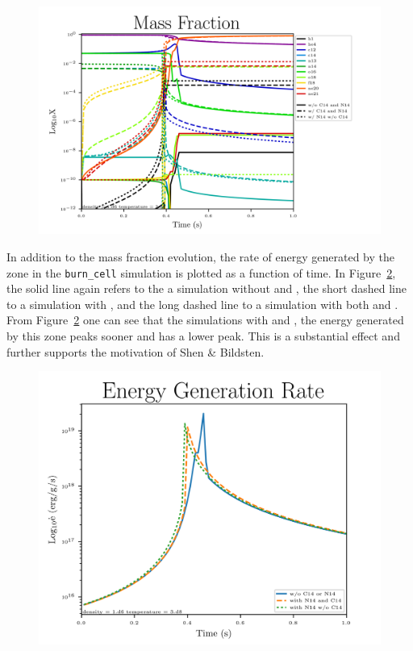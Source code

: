 \documentclass[11pt, oneside]{article}   	%
\begin{document}
      
      \begin{figure}
        \centering
        \includegraphics[width=5in]{images/subch_nC14nN14_xn_tol-10.png}
        \caption{}
        \label{fig:microphysicsX}
      \end{figure} 
      
      In addition to the mass fraction evolution, the rate of energy generated by the zone in the {\tt burn\_cell} simulation is plotted as a function of time. In Figure~\ref{fig:energygeneration}, the solid line again refers to the a simulation without  and , the short dashed line to a simulation with , and the long dashed line to a simulation with both  and . From Figure~\ref{fig:energygeneration} one can see that the simulations with  and , the energy generated by this zone peaks sooner and has a lower peak. This is a substantial effect and further supports the motivation of Shen \& Bildsten. %
      
      \begin{figure}
        \centering
        \includegraphics[width=5in]{images/subch_nC14nN14_edot_tol-10.png}
        \caption{}
        \label{fig:energygeneration}
      \end{figure} 
  
\end{document}
